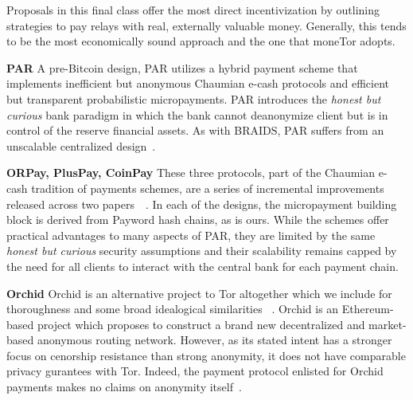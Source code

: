 Proposals in this final class offer the most direct incentivization by outlining
strategies to pay relays with real, externally valuable money. Generally, this
tends to be the most economically sound approach and the one that moneTor
adopts.

\textbf{PAR} A pre-Bitcoin design, PAR utilizes a hybrid payment scheme that
implements inefficient but anonymous Chaumian e-cash protocols and efficient but
transparent probabilistic micropayments. PAR introduces the \emph{honest but
  curious} bank paradigm in which the bank cannot deanonymize client but is in
control of the reserve financial assets. As with BRAIDS, PAR suffers from an
unscalable centralized design~\cite{androulaki2008payment}.

\textbf{ORPay, PlusPay, CoinPay} These three protocols, part of the Chaumian
e-cash tradition of payments schemes, are a series of incremental improvements
released across two papers~\cite{chen2009xpay}~\cite{carbunar2012tipping}. In
each of the designs, the micropayment building block is derived from Payword
hash chains, as is ours. While the schemes offer practical advantages to many
aspects of PAR, they are limited by the same \emph{honest but curious} security
assumptions and their scalability remains capped by the need for all clients to
interact with the central bank for each payment chain.

\textbf{Orchid} Orchid is an alternative project to Tor altogether which we
include for thoroughness and some broad idealogical similarities
~\cite{salamon2018orchid}. Orchid is an Ethereum-based project which proposes to
construct a brand new decentralized and market-based anonymous routing
network. However, as its stated intent has a stronger focus on cenorship
resistance than strong anonymity, it does not have comparable privacy gurantees
with Tor. Indeed, the payment protocol enlisted for Orchid payments makes no
claims on anonymity itself~\cite{pass2015micropayments}.